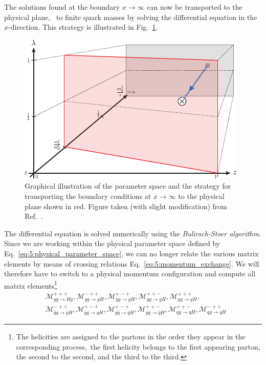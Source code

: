 The solutions found at the boundary $x \rightarrow \infty$ can now be transported to the physical plane, \ie\ to finite quark masses by solving the differential equation in the $x$-direction. This strategy is illustrated in Fig.~\ref{fig:5:integration3D}.
\begin{figure}[h]
\centering
\includegraphics[width=\figurewidth]{Images/integration3D_no_threshold.pdf}
\caption{Graphical illustration of the parameter space and the strategy for transporting the boundary conditions at $x \rightarrow \infty$ to the physical plane shown in red. Figure taken (with slight modification) from Ref.~\cite{Niggetiedt:2023ywb}.}
\label{fig:5:integration3D}
\end{figure}
The differential equation is solved numerically using the \textit{Bulirsch-Stoer algorithm}. Since we are working within the physical parameter space defined by Eq.~\eqref{eq:5:physical_parameter_space}, we can no longer relate the various matrix elements by means of crossing relations Eq.~\eqref{eq:5:momentum_exchange}. We will therefore have to switch to a physical momentum configuration and compute all matrix elements\footnote{The helicities are assigned to the partons in the order they appear in the corresponding process,\ie \ the first helicity belongs to the first appearing parton, the second to the second, and the third to the third.}
\begin{equation}
\begin{split}
&\mathcal{M}_{gg \rightarrow H g}^{+++}, \mathcal{M}_{gg \rightarrow g H }^{-++}, \mathcal{M}_{gg \rightarrow gH}^{+-+}, \mathcal{M}_{gg \rightarrow gH}^{++-}, \mathcal{M}_{gg \rightarrow gH }^{+++}, \\
&\mathcal{M}_{\bar{q} q \rightarrow gH }^{-++}, \mathcal{M}_{\bar{q} q \rightarrow gH }^{+-+}, \mathcal{M}_{g\bar{q} \rightarrow \bar{q}H}^{+-+}, \mathcal{M}_{g\bar{q} \rightarrow \bar{q}H}^{++-}, \mathcal{M}_{qg \rightarrow q H}^{++-}, \mathcal{M}_{qg \rightarrow q H}^{-++}
\end{split}
\end{equation}
